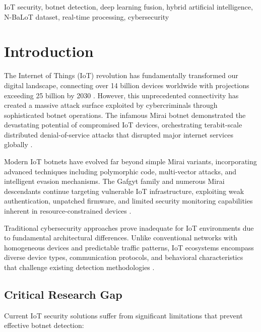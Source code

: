 \documentclass[conference]{IEEEtran}
\begin{document}
\begin{IEEEkeywords}
IoT security, botnet detection, deep learning fusion, hybrid artificial intelligence, N-BaLoT dataset, real-time processing, cybersecurity
\end{IEEEkeywords}

\section{Introduction}

The Internet of Things (IoT) revolution has fundamentally transformed our digital landscape, connecting over 14 billion devices worldwide with projections exceeding 25 billion by 2030 \cite{iot_growth_2024}. However, this unprecedented connectivity has created a massive attack surface exploited by cybercriminals through sophisticated botnet operations. The infamous Mirai botnet demonstrated the devastating potential of compromised IoT devices, orchestrating terabit-scale distributed denial-of-service attacks that disrupted major internet services globally \cite{mirai_analysis_2017}.

Modern IoT botnets have evolved far beyond simple Mirai variants, incorporating advanced techniques including polymorphic code, multi-vector attacks, and intelligent evasion mechanisms. The Gafgyt family and numerous Mirai descendants continue targeting vulnerable IoT infrastructure, exploiting weak authentication, unpatched firmware, and limited security monitoring capabilities inherent in resource-constrained devices \cite{iot_threats_survey_2023}.

Traditional cybersecurity approaches prove inadequate for IoT environments due to fundamental architectural differences. Unlike conventional networks with homogeneous devices and predictable traffic patterns, IoT ecosystems encompass diverse device types, communication protocols, and behavioral characteristics that challenge existing detection methodologies \cite{iot_security_challenges_2024}.

\subsection{Critical Research Gap}

Current IoT security solutions suffer from significant limitations that prevent effective botnet detection:
\end{document}
